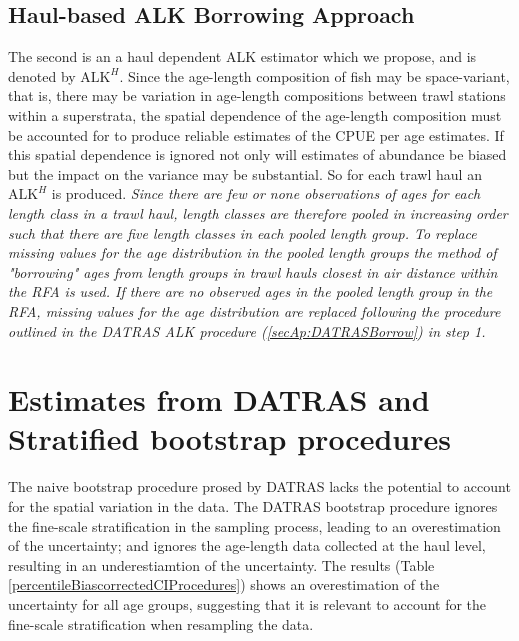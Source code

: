 \documentclass[a4paper 12pt]{article}
\numberwithin{equation}{section}
\begin{document}
\subsection{\normalsize Haul-based ALK Borrowing Approach}
\label{secAp:oursBorrow}
\indent  The second is an a haul dependent ALK estimator which we propose, and is denoted by $\mathrm{ALK}^{H}$. Since the age-length composition of fish may be space-variant, that is, there may be variation in age-length compositions between trawl stations within a superstrata, the spatial dependence of the age-length composition must be accounted for to produce reliable estimates of the CPUE per age estimates. If this spatial dependence is ignored not only will estimates of abundance be biased but the impact on the variance may be substantial. So for each trawl haul an $\mathrm{ALK}^{H}$ is produced. \emph{Since there are few or none observations of ages for each length class in a trawl haul, length classes are therefore pooled in increasing order such that there are five length classes in each pooled length group. To replace missing values for the age distribution in the pooled length groups the method of "borrowing" ages from length groups in trawl hauls closest in air distance within the RFA is used. If there are no observed ages in the pooled length group in the RFA, missing values for the age distribution are replaced following the procedure outlined in the DATRAS ALK procedure (\ref{secAp:DATRASBorrow}) in step 1.  }

\section{\large Estimates from DATRAS and Stratified bootstrap procedures}
\label{secAp:resultsdatrasALK}
The naive bootstrap procedure prosed by DATRAS lacks the potential to account for the spatial variation in the data. The DATRAS bootstrap procedure ignores the fine-scale stratification in the sampling process, leading to an overestimation of the uncertainty; and ignores the age-length data collected at the haul level, resulting in an underestiamtion of the uncertainty. The results (Table \ref{percentileBiascorrectedCIProcedures}) shows an overestimation of the uncertainty for all age groups, suggesting that it is relevant to account for the fine-scale stratification when resampling the data.
\end{document}
